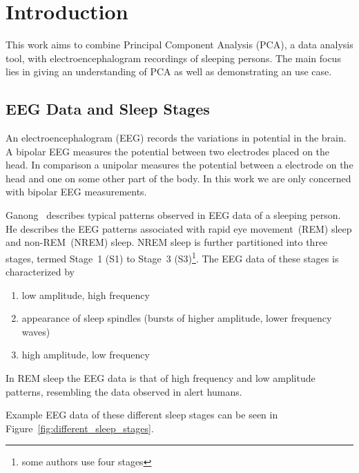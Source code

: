 \chapter{Introduction}
\label{chapter:introduction}

This work aims to combine Principal Component Analysis (PCA), a data analysis tool, with electroencephalogram recordings of sleeping persons. The main focus lies in giving an understanding of PCA as well as demonstrating an use case.

\section{EEG Data and Sleep Stages}
\label{sec:eeg_data_and_sleep_stages}

An electroencephalogram (EEG) records the variations in potential in the brain. A bipolar EEG measures the potential between two electrodes placed on the head. In comparison a unipolar measures the potential between a electrode on the head and one on some other part of the body. In this work we are only concerned with bipolar EEG measurements.

Ganong~\cite[chapter~11]{Ganong1997} describes typical patterns observed in EEG data of a sleeping person. He describes the EEG patterns associated with rapid eye movement~(REM) sleep and non-REM~(NREM) sleep. NREM sleep is further partitioned into three stages, termed Stage~1 (S1) to Stage~3 (S3)\footnote{some authors use four stages}. The EEG data of these stages is characterized by

\begin{enumerate}[label={S\arabic*:}]
	\item low amplitude, high frequency
	\item appearance of sleep spindles (bursts of higher amplitude, lower frequency waves)
	\item high amplitude, low frequency
\end{enumerate}

\noindent
In REM sleep the EEG data is that of high frequency and low amplitude patterns, resembling the data observed in alert humans.

Example EEG data of these different sleep stages can be seen in Figure~\ref{fig:different_sleep_stages}.

